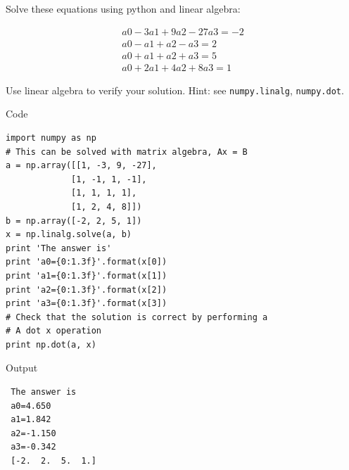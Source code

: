\documentclass[11pt]{article}
\begin{document}
Solve these equations using python and linear algebra:

\begin{eqnarray}
a0 - 3 a1 + 9 a2 - 27 a3 = -2 \\
a0 - a1 + a2 - a3 = 2 \\
a0 + a1 + a2 + a3 = 5 \\
a0 + 2a1 + 4 a2 + 8 a3 = 1
\end{eqnarray}

Use linear algebra to verify your solution. Hint: see \texttt{numpy.linalg}, \texttt{numpy.dot}.

Code

\begin{verbatim}
import numpy as np
# This can be solved with matrix algebra, Ax = B
a = np.array([[1, -3, 9, -27],
             [1, -1, 1, -1],
             [1, 1, 1, 1],
             [1, 2, 4, 8]])
b = np.array([-2, 2, 5, 1])
x = np.linalg.solve(a, b)
print 'The answer is'
print 'a0={0:1.3f}'.format(x[0])
print 'a1={0:1.3f}'.format(x[1])
print 'a2={0:1.3f}'.format(x[2])
print 'a3={0:1.3f}'.format(x[3])
# Check that the solution is correct by performing a 
# A dot x operation
print np.dot(a, x)
\end{verbatim}

Output
\begin{verbatim}
 The answer is
 a0=4.650
 a1=1.842
 a2=-1.150
 a3=-0.342
 [-2.  2.  5.  1.]
\end{verbatim}
\end{document}

